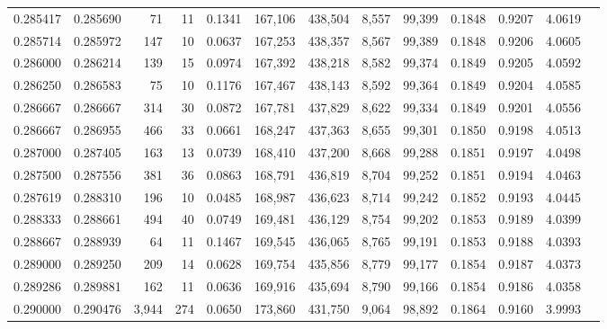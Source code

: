 \begin{tabular}{rrrrrrrrrrrrr}
0.285417 & 0.285690 &    71 &  11 &                                     0.1341 & 167,106 & 438,504 &   8,557 &  99,399 & 0.1848 & 0.9207 & 4.0619 \\
0.285714 & 0.285972 &   147 &  10 &                                     0.0637 & 167,253 & 438,357 &   8,567 &  99,389 & 0.1848 & 0.9206 & 4.0605 \\
0.286000 & 0.286214 &   139 &  15 &                                     0.0974 & 167,392 & 438,218 &   8,582 &  99,374 & 0.1849 & 0.9205 & 4.0592 \\
0.286250 & 0.286583 &    75 &  10 &                                     0.1176 & 167,467 & 438,143 &   8,592 &  99,364 & 0.1849 & 0.9204 & 4.0585 \\
0.286667 & 0.286667 &   314 &  30 &                                     0.0872 & 167,781 & 437,829 &   8,622 &  99,334 & 0.1849 & 0.9201 & 4.0556 \\
0.286667 & 0.286955 &   466 &  33 &                                     0.0661 & 168,247 & 437,363 &   8,655 &  99,301 & 0.1850 & 0.9198 & 4.0513 \\
0.287000 & 0.287405 &   163 &  13 &                                     0.0739 & 168,410 & 437,200 &   8,668 &  99,288 & 0.1851 & 0.9197 & 4.0498 \\
0.287500 & 0.287556 &   381 &  36 &                                     0.0863 & 168,791 & 436,819 &   8,704 &  99,252 & 0.1851 & 0.9194 & 4.0463 \\
0.287619 & 0.288310 &   196 &  10 &                                     0.0485 & 168,987 & 436,623 &   8,714 &  99,242 & 0.1852 & 0.9193 & 4.0445 \\
0.288333 & 0.288661 &   494 &  40 &                                     0.0749 & 169,481 & 436,129 &   8,754 &  99,202 & 0.1853 & 0.9189 & 4.0399 \\
0.288667 & 0.288939 &    64 &  11 &                                     0.1467 & 169,545 & 436,065 &   8,765 &  99,191 & 0.1853 & 0.9188 & 4.0393 \\
0.289000 & 0.289250 &   209 &  14 &                                     0.0628 & 169,754 & 435,856 &   8,779 &  99,177 & 0.1854 & 0.9187 & 4.0373 \\
0.289286 & 0.289881 &   162 &  11 &                                     0.0636 & 169,916 & 435,694 &   8,790 &  99,166 & 0.1854 & 0.9186 & 4.0358 \\
0.290000 & 0.290476 & 3,944 & 274 &                                     0.0650 & 173,860 & 431,750 &   9,064 &  98,892 & 0.1864 & 0.9160 & 3.9993 \\

\end{tabular}
